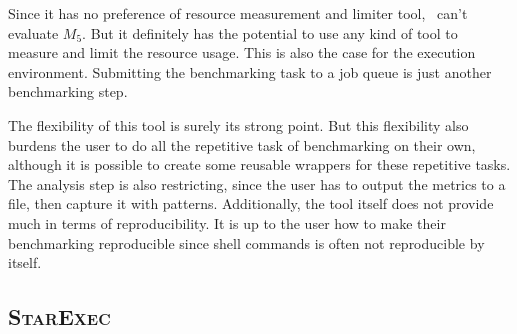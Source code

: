 Since it has no preference of resource measurement and limiter tool, \first~can't evaluate $M_5$.
But it definitely has the potential to use any kind of tool to measure and limit the resource usage.
This is also the case for the execution environment.
Submitting the benchmarking task to a job queue is just another benchmarking step.

The flexibility of this tool is surely its strong point.
But this flexibility also burdens the user to do all the repetitive task of benchmarking on their own, although it is possible to create some reusable wrappers for these repetitive tasks.
The analysis step is also restricting, since the user has to output the metrics to a file, then capture it with patterns.
Additionally, the tool itself does not provide much in terms of reproducibility.
It is up to the user how to make their benchmarking reproducible since shell commands is often not reproducible by itself.


\subsection{\textsc{StarExec}}

